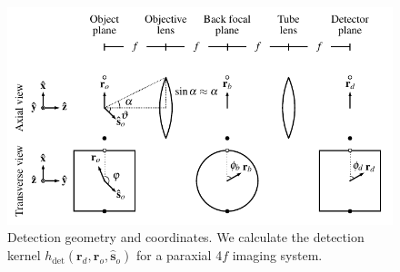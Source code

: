 \documentclass[]{osa-article}
\providecommand{\ro}{\mathbf{\mathbf{r}}_o}
\providecommand{\so}{\mathbf{\hat{s}}_o}
\providecommand{\rd}{\mathbf{r}_d}
\begin{document}
\begin{figure}[h]
 \centering
   \centering
   \includegraphics[scale=.9]{../figures/detection-coords/detection-coords.pdf}
   \caption{Detection geometry and coordinates. We calculate the detection
     kernel $h_{\text{det}}(\rd, \ro, \so)$ for a paraxial 4$f$ imaging
     system.}
   \label{fig:detection}
 \end{figure}
 
\end{document}
